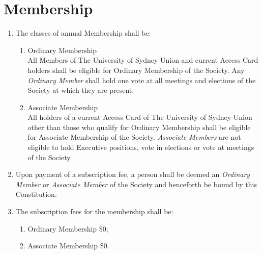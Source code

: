 \documentclass[11pt]{article}
\begin{document}
\section{Membership}
\begin{enumerate}[\thesection .1]
    \item The classes of annual Membership shall be:
    \begin{enumerate}
        \item Ordinary Membership \\ All Members of The University of Sydney Union and current Access Card holders shall be eligible for Ordinary Membership of the Society. Any \textit{Ordinary Member} shall hold one vote at all meetings and elections of the Society at which they are present.
        \item Associate Membership \\ All holders of a current Access Card of The University of Sydney Union other than those who qualify for Ordinary Membership shall be eligible for Associate Membership of the Society. \textit{Associate Members} are not eligible to hold Executive positions, vote in elections or vote at meetings of the Society.
    \end{enumerate}
    \item Upon payment of a subscription fee, a person shall be deemed an \textit{Ordinary Member} or \textit{Associate Member} of the Society and henceforth be bound by this Constitution.
    \item The subscription fees for the membership shall be:
    \begin{enumerate}
        \item Ordinary Membership \$0;
        \item Associate Membership \$0.
    \end{enumerate}
\end{enumerate}
\end{document}
